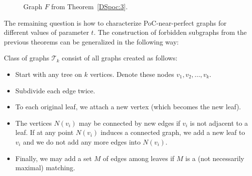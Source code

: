 \begin{figure}
	\centering
        
	\caption{Graph \(F\) from Theorem~\ref{DSpoc:3}.}
	\label{DS:graphF}
\end{figure}
The remaining question is how to characterize PoC-near-perfect graphs for different values of parameter \(t\).
The construction of forbidden subgraphs from the previous theorems can be generalized in the following way:
\begin{defn}\label{DS:tk}
	Class of graphs \(\mathcal{T}_k\) consist of all graphs created as follows:
	\begin{itemize}
		\item Start with any tree on \(k\) vertices. Denote these nodes \(v_1, v_2, \dots, v_k\).
		\item Subdivide each edge twice.
		\item To each original leaf, we attach a new vertex (which becomes the new leaf).
		\item The vertices \(N(v_i)\) may be connected by new edges if \(v_i\) is not adjacent to a leaf. 
                  If at any point \(N(v_i)\) induces a connected graph, we add a new leaf to \(v_i\)
                  and we do not add any more edges into \(N(v_i)\).
		\item Finally, we may add a set $M$ of edges among leaves if $M$ is a (not necessarily maximal)
                  matching.
	\end{itemize}
\end{defn}

